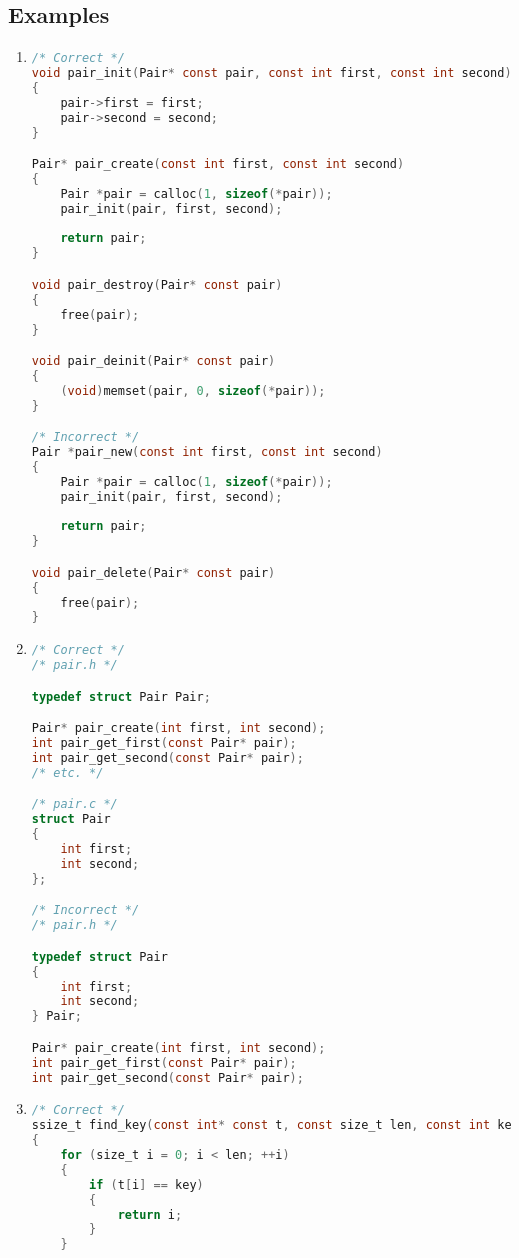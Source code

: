 \subsection{Examples}
\begin{enumerate}
    \item
\begin{lstlisting}[language=C,style=C99]
/* Correct */
void pair_init(Pair* const pair, const int first, const int second)
{
    pair->first = first;
    pair->second = second;
}

Pair* pair_create(const int first, const int second)
{
    Pair *pair = calloc(1, sizeof(*pair));
    pair_init(pair, first, second);
    
    return pair;
}

void pair_destroy(Pair* const pair)
{
    free(pair);    
}

void pair_deinit(Pair* const pair)
{
    (void)memset(pair, 0, sizeof(*pair));
}

/* Incorrect */
Pair *pair_new(const int first, const int second)
{
    Pair *pair = calloc(1, sizeof(*pair));
    pair_init(pair, first, second);
    
    return pair;
}

void pair_delete(Pair* const pair)
{
    free(pair);    
}

\end{lstlisting}

    \item
\begin{lstlisting}[language=C,style=C99]
/* Correct */
/* pair.h */

typedef struct Pair Pair;

Pair* pair_create(int first, int second);
int pair_get_first(const Pair* pair);
int pair_get_second(const Pair* pair);
/* etc. */

/* pair.c */
struct Pair
{
    int first;
    int second;
};

/* Incorrect */
/* pair.h */

typedef struct Pair
{
    int first;
    int second;
} Pair;

Pair* pair_create(int first, int second);
int pair_get_first(const Pair* pair);
int pair_get_second(const Pair* pair);

\end{lstlisting}

    \item
\begin{lstlisting}[language=C,style=C99]
/* Correct */
ssize_t find_key(const int* const t, const size_t len, const int key)
{
	for (size_t i = 0; i < len; ++i)
	{
		if (t[i] == key)
		{
			return i;
		}
	}
			

\end{lstlisting}
\end{enumerate}
